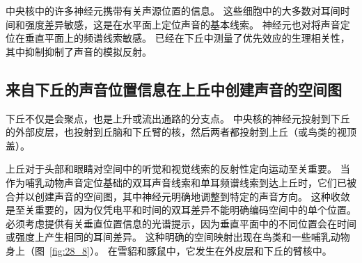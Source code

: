 中央核中的许多神经元携带有关声源位置的信息。
这些细胞中的大多数对耳间时间和强度差异敏感，这是在水平面上定位声音的基本线索。
神经元也对将声音定位在垂直平面上的频谱线索敏感。
已经在下丘中测量了优先效应的生理相关性，其中抑制抑制了声音的模拟反射。




\subsection{来自下丘的声音位置信息在上丘中创建声音的空间图}

下丘不仅是会聚点，也是上升或流出通路的分支点。
中央核的神经元投射到下丘的外部皮层，也投射到丘脑和下丘臂的核，然后两者都投射到上丘（或鸟类的视顶盖）。


上丘对于头部和眼睛对空间中的听觉和视觉线索的反射性定向运动至关重要。
当作为哺乳动物声音定位基础的双耳声音线索和单耳频谱线索到达上丘时，它们已被合并以创建声音的空间图，其中神经元明确地调整到特定的声音方向。
这种收敛是至关重要的，因为仅凭电平和时间的双耳差异不能明确编码空间中的单个位置。
必须考虑提供有关垂直位置信息的光谱提示，因为垂直平面中的不同位置会在时间或强度上产生相同的耳间差异。
这种明确的空间映射出现在鸟类和一些哺乳动物身上（图~\ref{fig:28_8}）。 
在雪貂和豚鼠中，它发生在外皮层和下丘的臂核中。


